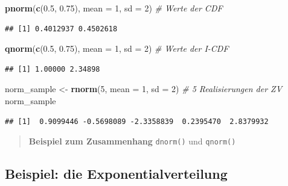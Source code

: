 \documentclass[]{book}
\newenvironment{Shaded}{\begin{snugshade}}{\end{snugshade}}
\newcommand{\KeywordTok}[1]{\textcolor[rgb]{0.13,0.29,0.53}{\textbf{#1}}}
\newcommand{\DataTypeTok}[1]{\textcolor[rgb]{0.13,0.29,0.53}{#1}}
\newcommand{\DecValTok}[1]{\textcolor[rgb]{0.00,0.00,0.81}{#1}}
\newcommand{\FloatTok}[1]{\textcolor[rgb]{0.00,0.00,0.81}{#1}}
\newcommand{\StringTok}[1]{\textcolor[rgb]{0.31,0.60,0.02}{#1}}
\newcommand{\CommentTok}[1]{\textcolor[rgb]{0.56,0.35,0.01}{\textit{#1}}}
\newcommand{\NormalTok}[1]{#1}
\begin{document}
\begin{Shaded}
\begin{Highlighting}[]
\KeywordTok{pnorm}\NormalTok{(}\KeywordTok{c}\NormalTok{(}\FloatTok{0.5}\NormalTok{, }\FloatTok{0.75}\NormalTok{), }\DataTypeTok{mean =} \DecValTok{1}\NormalTok{, }\DataTypeTok{sd =} \DecValTok{2}\NormalTok{) }\CommentTok{# Werte der CDF}
\end{Highlighting}
\end{Shaded}

\begin{verbatim}
## [1] 0.4012937 0.4502618
\end{verbatim}

\begin{Shaded}
\begin{Highlighting}[]
\KeywordTok{qnorm}\NormalTok{(}\KeywordTok{c}\NormalTok{(}\FloatTok{0.5}\NormalTok{, }\FloatTok{0.75}\NormalTok{), }\DataTypeTok{mean =} \DecValTok{1}\NormalTok{, }\DataTypeTok{sd =} \DecValTok{2}\NormalTok{) }\CommentTok{# Werte der I-CDF}
\end{Highlighting}
\end{Shaded}

\begin{verbatim}
## [1] 1.00000 2.34898
\end{verbatim}

\begin{Shaded}
\begin{Highlighting}[]
\NormalTok{norm_sample <-}\StringTok{ }\KeywordTok{rnorm}\NormalTok{(}\DecValTok{5}\NormalTok{, }\DataTypeTok{mean =} \DecValTok{1}\NormalTok{, }\DataTypeTok{sd =} \DecValTok{2}\NormalTok{) }\CommentTok{# 5 Realisierungen der ZV}
\NormalTok{norm_sample}
\end{Highlighting}
\end{Shaded}

\begin{verbatim}
## [1]  0.9099446 -0.5698089 -2.3358839  0.2395470  2.8379932
\end{verbatim}

\begin{quote}
\textbf{Beispiel zum Zusammenhang} \texttt{dnorm()} und \texttt{qnorm()}
\end{quote}

\subsection{Beispiel: die
Exponentialverteilung}\label{beispiel-die-exponentialverteilung}
\end{document}
